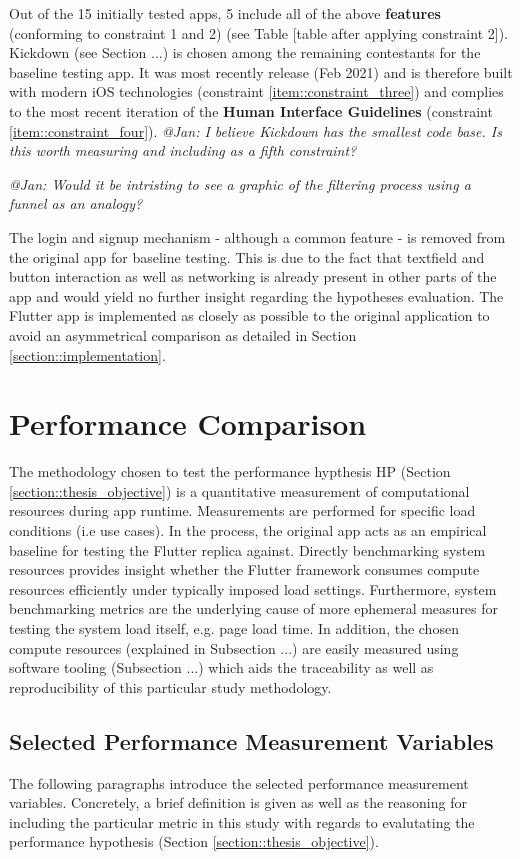 Out of the 15 initially tested apps, 5 include all of the above \textbf{features} (conforming to
constraint 1 and 2) (see Table [table after applying constraint 2]). Kickdown (see Section ...) is chosen among the remaining 
contestants for the baseline testing app. It was most recently release (Feb 2021) and is therefore built with modern iOS technologies (constraint \ref{item::constraint_three})
and complies to the most recent iteration of the \textbf{Human Interface Guidelines} (constraint \ref{item::constraint_four}).
\textit{@Jan: I believe Kickdown has the smallest code base. Is this worth measuring and including as a fifth constraint?}

\textit{@Jan: Would it be intristing to see a graphic of the filtering process using a funnel as an analogy?}


The login and signup mechanism - although a common feature - is removed from the original
app for baseline testing. This is due to the fact that textfield and button interaction as well
as networking is already present in other parts of the app and would yield no further insight
regarding the hypotheses evaluation.
The Flutter app is implemented as closely as possible to the original application to avoid an
asymmetrical comparison as detailed in Section \ref{section::implementation}.

\section{Performance Comparison} \label{section::performance_comparison_design}
The methodology chosen to test the performance hypthesis HP (Section \ref{section::thesis_objective}) is a quantitative
measurement of computational resources during app runtime. Measurements are performed for
specific load conditions (i.e use cases). In the process, the original app acts as an empirical
baseline for testing the Flutter replica against.
Directly benchmarking system resources provides insight whether the Flutter framework consumes
compute resources efficiently under typically imposed load settings. Furthermore, system
benchmarking metrics are the underlying cause of more ephemeral measures for testing the
system load itself, e.g. page load time. In addition, the chosen compute resources (explained
in Subsection ...) are easily measured using software tooling (Subsection ...) which aids the
traceability as well as reproducibility of this particular study methodology.

\subsection{Selected Performance Measurement Variables}
The following paragraphs introduce the selected performance measurement variables. Concretely,
a brief definition is given as well as the reasoning for including the particular metric in
this study with regards to evalutating the performance hypothesis (Section \ref{section::thesis_objective}).

